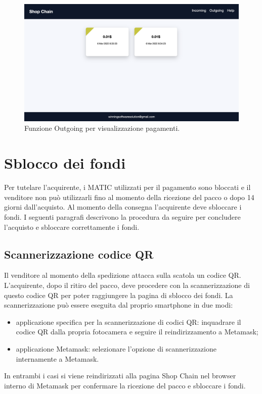 \documentclass[a4paper, 12pt]{article}
\begin{document}
\FloatBarrier
\begin{figure}
\centering
\includegraphics[width=0.7\linewidth]{img/visualizzazione_ordini.png}
\caption{Funzione Outgoing per visualizzazione pagamenti.}
\end{figure}
\FloatBarrier

\section{Sblocco dei fondi}
Per tutelare l'acquirente, i MATIC utilizzati per il pagamento sono bloccati e il venditore non può utilizzarli fino al momento della ricezione del pacco o dopo 14 giorni dall'acquisto. Al momento della consegna l'acquirente deve sbloccare i fondi. I seguenti paragrafi descrivono la procedura da seguire per concludere l'acquisto e sbloccare correttamente i fondi.
\subsection{Scannerizzazione codice QR}
Il venditore al momento della spedizione attacca sulla scatola un codice QR. L'acquirente, dopo il ritiro del pacco, deve procedere con la scannerizzazione di questo codice QR per poter raggiungere la pagina di sblocco dei fondi. La scannerizzazione può essere eseguita dal proprio smartphone in due modi:
\begin{itemize}
\item applicazione specifica per la scannerizzazione di codici QR: inquadrare il codice QR dalla propria fotocamera e seguire il reindirizzamento a Metamask;
\item applicazione Metamask: selezionare l'opzione di scannerizzazione internamente a Metamask.
\end{itemize}
In entrambi i casi si viene reindirizzati alla pagina Shop Chain nel browser interno di Metamask per confermare la ricezione del pacco e sbloccare i fondi.
\end{document}
